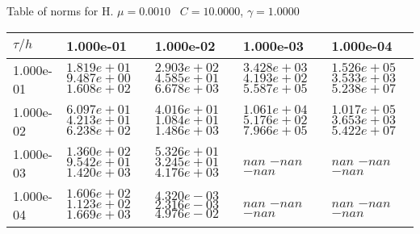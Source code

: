 \begin{center}
Table of norms for H. $\mu = 0.0010$ \, $C = 10.0000$, $\gamma = 1.0000$
  
\begin{tabular}{|p{1in}|p{1in}|p{1in}|p{1in}|p{1in}|} \hline
$\tau / h$ &1.000e-01 &1.000e-02 &1.000e-03 &1.000e-04 \\ \hline 
1.000e-01 & $1.819e+01$  $9.487e+00$  $1.608e+02$  & $2.903e+02$  $4.585e+01$  $6.678e+03$  & $3.428e+03$  $4.193e+02$  $5.587e+05$  & $1.526e+05$  $3.533e+03$  $5.238e+07$  \\ \hline 
1.000e-02 & $6.097e+01$  $4.213e+01$  $6.238e+02$  & $4.016e+01$  $1.084e+01$  $1.486e+03$  & $1.061e+04$  $5.176e+02$  $7.966e+05$  & $1.017e+05$  $3.653e+03$  $5.422e+07$  \\ \hline 
1.000e-03 & $1.360e+02$  $9.542e+01$  $1.420e+03$  & $5.326e+01$  $3.245e+01$  $4.176e+03$  & $nan$  $-nan$  $-nan$  & $nan$  $-nan$  $-nan$  \\ \hline 
1.000e-04 & $1.606e+02$  $1.123e+02$  $1.669e+03$  & $4.320e-03$  $2.316e-03$  $4.976e-02$  & $nan$  $-nan$  $-nan$  & $nan$  $-nan$  $-nan$  \\ \hline 

\end{tabular}\\[20pt]
\end{center}
